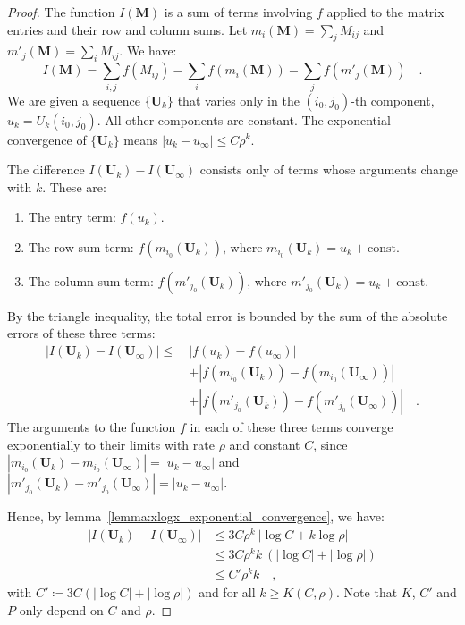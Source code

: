 \documentclass[../../main.tex]{subfiles}
\begin{document}
\begin{proof}
The function $I(\bm{M})$ is a sum of terms involving $f$ applied to the matrix entries and their row and column sums. Let $m_i(\bm{M}) = \sum_j M_{ij}$ and $m'_j(\bm{M}) = \sum_i M_{ij}$. We have:
\[
    I(\bm{M}) = \sum_{i,j} f(M_{ij}) - \sum_i f(m_i(\bm{M})) - \sum_j f(m'_j(\bm{M})) \quad .
\]
We are given a sequence $\{\bm{U}_k\}$ that varies only in the $(i_0, j_0)$-th component, $u_k = U_k(i_0, j_0)$. All other components are constant. The exponential convergence of $\{\bm{U}_k\}$ means $|u_k - u_\infty| \le C \rho^k$.

The difference $I(\bm{U}_k) - I(\bm{U}_\infty)$ consists only of terms whose arguments change with $k$. These are:
\begin{enumerate}
    \item The entry term: $f(u_k)$.
    \item The row-sum term: $f(m_{i_0}(\bm{U}_k))$, where $m_{i_0}(\bm{U}_k) = u_k + \text{const}$.
    \item The column-sum term: $f(m'_{j_0}(\bm{U}_k))$, where $m'_{j_0}(\bm{U}_k) = u_k + \text{const}$.
\end{enumerate}
By the triangle inequality, the total error is bounded by the sum of the absolute errors of these three terms:
\begin{align*}
|I(\bm{U}_k) - I(\bm{U}_\infty)| \le \ & |f(u_k) - f(u_\infty)| \\
& + |f(m_{i_0}(\bm{U}_k)) - f(m_{i_0}(\bm{U}_\infty))| \\
& + |f(m'_{j_0}(\bm{U}_k)) - f(m'_{j_0}(\bm{U}_\infty))| \quad .
\end{align*}
The arguments to the function $f$ in each of these three terms converge exponentially to their limits with rate $\rho$ and constant $C$, since $|m_{i_0}(\bm{U}_k) - m_{i_0}(\bm{U}_\infty)| = |u_k - u_\infty|$ and $|m'_{j_0}(\bm{U}_k) - m'_{j_0}(\bm{U}_\infty)| = |u_k - u_\infty|$.

Hence, by lemma~\ref{lemma:xlogx_exponential_convergence}, we have:
\begin{align*}
|I(\bm{U}_k) - I(\bm{U}_\infty)| &\leq 3 C \rho^k \ |\log C + k \log \rho| \\
&\leq 3 C \rho^k k \ (|\log C| + |\log \rho|) \\
&\leq C' \rho^k k \quad ,
\end{align*}
with $C' \coloneqq 3 C (|\log C| + |\log \rho|)$ and for all $k \geq K(C, \rho)$. Note that $K$, $C'$ and $P$ only depend on $C$ and $\rho$.
\end{proof}
\end{document}
